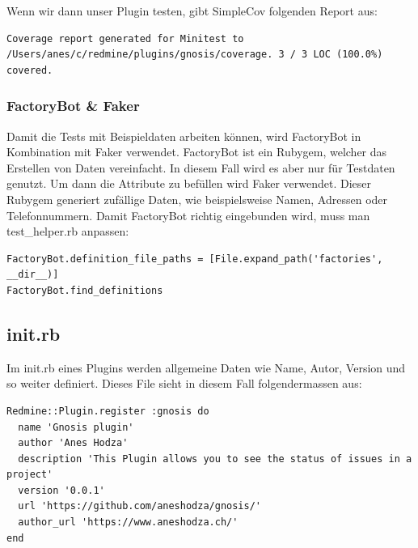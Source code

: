 Wenn wir dann unser Plugin testen, gibt SimpleCov folgenden Report aus:
\begin{codebox}
  \begin{verbatim}
Coverage report generated for Minitest to /Users/anes/c/redmine/plugins/gnosis/coverage. 3 / 3 LOC (100.0%) covered.
  \end{verbatim}
\end{codebox}

\subsubsection{FactoryBot \& Faker}
Damit die Tests mit Beispieldaten arbeiten können, wird FactoryBot in Kombination mit Faker verwendet. FactoryBot ist ein
Rubygem, welcher das Erstellen von Daten vereinfacht. In diesem Fall wird es aber nur für Testdaten genutzt. Um dann die
Attribute zu befüllen wird Faker verwendet. Dieser Rubygem generiert zufällige Daten, wie beispielsweise Namen, Adressen
oder Telefonnummern. \newline
Damit FactoryBot richtig eingebunden wird, muss man test\_helper.rb anpassen:
\begin{codebox}[]
  \begin{verbatim}
FactoryBot.definition_file_paths = [File.expand_path('factories', __dir__)]
FactoryBot.find_definitions
  \end{verbatim}
\end{codebox}

\subsection{init.rb}
Im init.rb eines Plugins werden allgemeine Daten wie Name, Autor, Version und so weiter definiert. Dieses File sieht
in diesem Fall folgendermassen aus:
\begin{codebox}[]
  \begin{verbatim}
Redmine::Plugin.register :gnosis do
  name 'Gnosis plugin'
  author 'Anes Hodza'
  description 'This Plugin allows you to see the status of issues in a project'
  version '0.0.1'
  url 'https://github.com/aneshodza/gnosis/'
  author_url 'https://www.aneshodza.ch/'
end
  \end{verbatim}
\end{codebox}

